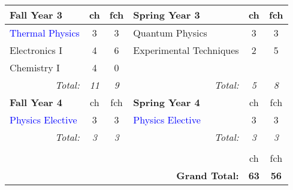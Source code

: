 \documentclass[12pt,preprint]{aastex}
\newcommand{\red}[1]{\textcolor{red}{#1}}
\newcommand{\blue}[1]{\textcolor{blue}{#1}}
\begin{document}
\begin{longtable}{lcclcc}
\hline
{\bf Fall Year 3} & {\sc ch} & {\sc fch} & {\bf Spring Year 3} & {\sc ch} & {\sc fch}  \\ 
\hline
\hline
\blue{Thermal Physics}           & 3 & 3 & Quantum Physics         & 3 & 3 \\
Electronics I                    & 4 & 6 & Experimental Techniques & 2 & 5 \\
Chemistry I                      & 4 & 0 &                         &   &   \\
\multicolumn{1}{r}{\emph{Total:}} & \emph{11} & \emph{9} &
\multicolumn{1}{r}{\emph{Total:}} & \emph{5}  & \emph{8} \\

\hline
{\bf Fall Year 4} & {\sc ch} & {\sc fch} & {\bf Spring Year 4} & {\sc ch} & {\sc fch} \\ 
\hline
\hline
\blue{Physics Elective} & 3 & 3 & \blue{Physics Elective}  & 3 & 3 \\
\multicolumn{1}{r}{\emph{Total:}} & \emph{3} & \emph{3} &
\multicolumn{1}{r}{\emph{Total:}} & \emph{3}  & \emph{3} \\
\hline \\
 &   &   &  & {\sc ch} & {\sc fch} \\  
 &   &   & \multicolumn{1}{r}{{\bf Grand Total:}} & {\bf 63} & {\bf 56} \\  
\end{longtable}

\newpage
\end{document}
